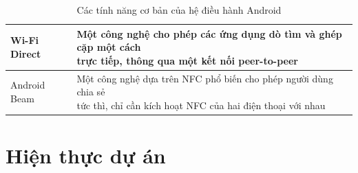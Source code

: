 \documentclass[a4paper]{article}
\begin{document}
\begin{table}[h]
\begin{tabular}{|l|l|}
Wi-Fi Direct & \pbox{24cm}{Một công nghệ cho phép các ứng dụng dò tìm và ghép cặp một cách \\ trực tiếp, thông qua một kết nối peer-to-peer} \\[5pt] \hline
Android Beam & \pbox{24cm}{Một công nghệ dựa trên NFC phổ biến cho phép người dùng chia sẻ \\ tức thì, chỉ cần kích hoạt NFC của hai điện thoại với nhau} \\[5pt] \hline
\end{tabular}
\caption{Các tính năng cơ bản của hệ điều hành Android}
\label{my-label}
\end{table}
\section{Hiện thực dự án}
\end{document}
